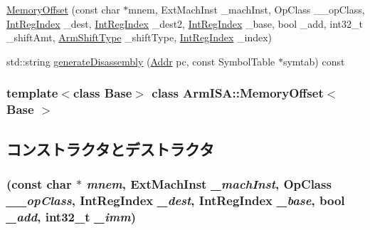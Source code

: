 \begin{DoxyCompactItemize}
\item 
\hyperlink{classArmISA_1_1MemoryOffset_aaca22f89e99b8d6460f5edfb83b33676}{MemoryOffset} (const char $\ast$mnem, ExtMachInst \_\-machInst, OpClass \_\-\_\-opClass, \hyperlink{namespaceArmISA_ae64680ba9fb526106829d6bf92fc791b}{IntRegIndex} \_\-dest, \hyperlink{namespaceArmISA_ae64680ba9fb526106829d6bf92fc791b}{IntRegIndex} \_\-dest2, \hyperlink{namespaceArmISA_ae64680ba9fb526106829d6bf92fc791b}{IntRegIndex} \_\-base, bool \_\-add, int32\_\-t \_\-shiftAmt, \hyperlink{namespaceArmISA_a209d79feaaef0aa2f54ae62e53ee90de}{ArmShiftType} \_\-shiftType, \hyperlink{namespaceArmISA_ae64680ba9fb526106829d6bf92fc791b}{IntRegIndex} \_\-index)
\item 
std::string \hyperlink{classArmISA_1_1MemoryOffset_a95d323a22a5f07e14d6b4c9385a91896}{generateDisassembly} (\hyperlink{classm5_1_1params_1_1Addr}{Addr} pc, const SymbolTable $\ast$symtab) const 
\end{DoxyCompactItemize}
\subsubsection*{template$<$class Base$>$ class ArmISA::MemoryOffset$<$ Base $>$}



\subsection{コンストラクタとデストラクタ}
\hypertarget{classArmISA_1_1MemoryOffset_a0e8da996a9bea28e978dbc7c35ac4b81}{
\subsubsection[{MemoryOffset}]{ (const char $\ast$ {\em mnem}, \/  ExtMachInst {\em \_\-machInst}, \/  OpClass {\em \_\-\_\-opClass}, \/  {\bf IntRegIndex} {\em \_\-dest}, \/  {\bf IntRegIndex} {\em \_\-base}, \/  bool {\em \_\-add}, \/  int32\_\-t {\em \_\-imm})}}
\label{classArmISA_1_1MemoryOffset_a0e8da996a9bea28e978dbc7c35ac4b81}



